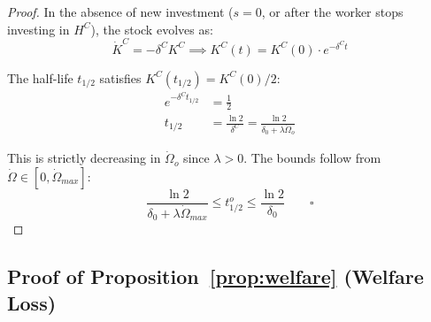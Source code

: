 \documentclass[11pt,a4paper]{article}
\theoremstyle{definition}
\begin{document}
\begin{proof}
In the absence of new investment ($s = 0$, or after the worker stops investing in $H^C$), the stock evolves as:
\begin{equation}
\dot{K}^C = -\delta^C K^C \implies K^C(t) = K^C(0) \cdot e^{-\delta^C t}
\end{equation}

The half-life $t_{1/2}$ satisfies $K^C(t_{1/2}) = K^C(0)/2$:
\begin{align}
e^{-\delta^C t_{1/2}} &= \frac{1}{2} \\
t_{1/2} &= \frac{\ln 2}{\delta^C} = \frac{\ln 2}{\delta_0 + \lambda \dot{\Omega}_o}
\end{align}

This is strictly decreasing in $\dot{\Omega}_o$ since $\lambda > 0$. The bounds follow from $\dot{\Omega} \in [0, \dot{\Omega}_{max}]$:
\begin{equation}
\frac{\ln 2}{\delta_0 + \lambda \dot{\Omega}_{max}} \leq t_{1/2}^o \leq \frac{\ln 2}{\delta_0} \qquad \square
\end{equation}
\end{proof}

\subsection{Proof of Proposition~\ref{prop:welfare} (Welfare Loss)}
\end{document}
